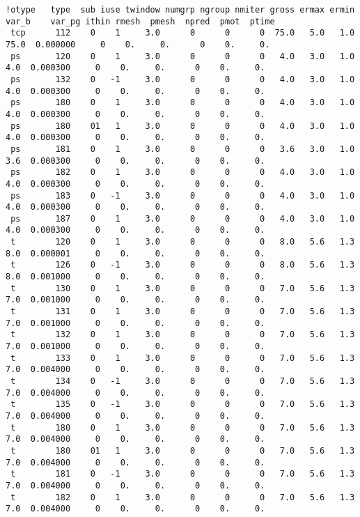\begin{enumerate}[leftmargin=*]
\begin{itemize}[leftmargin=*]
\begin{tiny}
\begin{verbatim}
!otype   type  sub iuse twindow numgrp ngroup nmiter gross ermax ermin var_b    var_pg ithin rmesh  pmesh  npred  pmot  ptime
 tcp      112    0    1     3.0      0      0      0  75.0   5.0   1.0  75.0  0.000000     0    0.     0.      0    0.     0.
 ps       120    0    1     3.0      0      0      0   4.0   3.0   1.0   4.0  0.000300     0    0.     0.      0    0.     0.
 ps       132    0   -1     3.0      0      0      0   4.0   3.0   1.0   4.0  0.000300     0    0.     0.      0    0.     0.
 ps       180    0    1     3.0      0      0      0   4.0   3.0   1.0   4.0  0.000300     0    0.     0.      0    0.     0.
 ps       180    01   1     3.0      0      0      0   4.0   3.0   1.0   4.0  0.000300     0    0.     0.      0    0.     0.
 ps       181    0    1     3.0      0      0      0   3.6   3.0   1.0   3.6  0.000300     0    0.     0.      0    0.     0.
 ps       182    0    1     3.0      0      0      0   4.0   3.0   1.0   4.0  0.000300     0    0.     0.      0    0.     0.
 ps       183    0   -1     3.0      0      0      0   4.0   3.0   1.0   4.0  0.000300     0    0.     0.      0    0.     0.
 ps       187    0    1     3.0      0      0      0   4.0   3.0   1.0   4.0  0.000300     0    0.     0.      0    0.     0.
 t        120    0    1     3.0      0      0      0   8.0   5.6   1.3   8.0  0.000001     0    0.     0.      0    0.     0.
 t        126    0   -1     3.0      0      0      0   8.0   5.6   1.3   8.0  0.001000     0    0.     0.      0    0.     0.
 t        130    0    1     3.0      0      0      0   7.0   5.6   1.3   7.0  0.001000     0    0.     0.      0    0.     0.
 t        131    0    1     3.0      0      0      0   7.0   5.6   1.3   7.0  0.001000     0    0.     0.      0    0.     0.
 t        132    0    1     3.0      0      0      0   7.0   5.6   1.3   7.0  0.001000     0    0.     0.      0    0.     0.
 t        133    0    1     3.0      0      0      0   7.0   5.6   1.3   7.0  0.004000     0    0.     0.      0    0.     0.
 t        134    0   -1     3.0      0      0      0   7.0   5.6   1.3   7.0  0.004000     0    0.     0.      0    0.     0.
 t        135    0   -1     3.0      0      0      0   7.0   5.6   1.3   7.0  0.004000     0    0.     0.      0    0.     0.
 t        180    0    1     3.0      0      0      0   7.0   5.6   1.3   7.0  0.004000     0    0.     0.      0    0.     0.
 t        180    01   1     3.0      0      0      0   7.0   5.6   1.3   7.0  0.004000     0    0.     0.      0    0.     0.
 t        181    0   -1     3.0      0      0      0   7.0   5.6   1.3   7.0  0.004000     0    0.     0.      0    0.     0.
 t        182    0    1     3.0      0      0      0   7.0   5.6   1.3   7.0  0.004000     0    0.     0.      0    0.     0.
\end{verbatim}
\end{tiny}


\end{itemize}
\end{enumerate}
